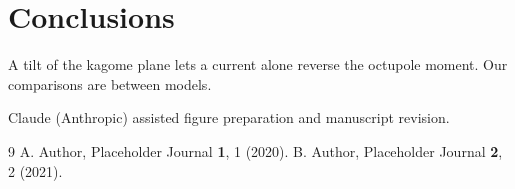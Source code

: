 \documentclass[aip,reprint]{revtex4-2}
\begin{document}
\section{Conclusions}
\label{sec:conclusions}
A tilt of the kagome plane lets a current alone reverse the octupole moment.
Our comparisons are between models.

\begin{acknowledgments}
Claude (Anthropic) assisted figure preparation and manuscript revision.
\end{acknowledgments}

\begin{thebibliography}{9}
 A. Author, Placeholder Journal \textbf{1}, 1 (2020).
 B. Author, Placeholder Journal \textbf{2}, 2 (2021).
\end{thebibliography}
\end{document}
